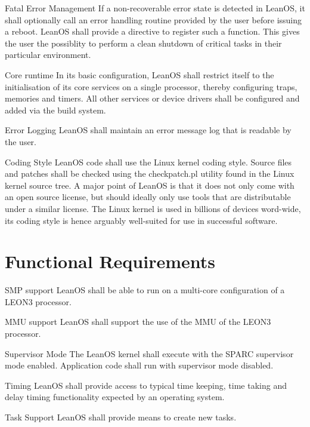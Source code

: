 {Fatal Error Management}{%
If a non-recoverable error state is detected in LeanOS, it shall optionally
call an error handling routine provided by the user before issuing a reboot.
LeanOS shall provide a directive to register such a function.
}{%
This gives the user the possiblity to perform a clean shutdown of critical
tasks in their particular environment.}%


 {Core runtime}{%
In its basic configuration, LeanOS shall restrict itself to the initialisation
of its core services on a single processor, thereby configuring traps, memories
and timers. All other services or device drivers shall be configured and added
via the build system.
}{}%

 {Error Logging}{%
LeanOS shall maintain an error message log that is readable by the user.
}{}%

 {Coding Style}{%
LeanOS code shall use the Linux kernel coding style. Source files and patches
shall be checked using the checkpatch.pl utility found in the Linux kernel
source tree.
}{%
A major point of LeanOS is that it does not only come with an open source
license, but should ideally only use tools that are distributable under a
similar license. The Linux kernel is used in billions of devices word-wide,
its coding style is hence arguably well-suited for use in successful software.
}%


\section{Functional Requirements}

 {SMP support}{%
LeanOS shall be able to run on a multi-core configuration of a LEON3 processor.
}{}%

 {MMU support}{%
LeanOS shall support the use of the MMU of the LEON3 processor.
}{}%

 {Supervisor Mode}{%
The LeanOS kernel shall execute with the SPARC supervisor mode enabled.
Application code shall run with supervisor mode disabled.
}{}%

 {Timing}{%
LeanOS shall provide access to typical time keeping, time taking and delay
timing functionality expected by an operating system.
}{}%


 {Task Support}{%
LeanOS shall provide means to create new tasks.
}{}%

